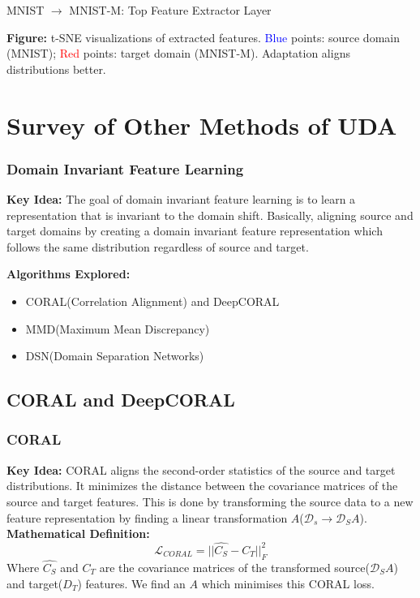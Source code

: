 \documentclass{beamer}
\begin{document}
\begin{frame}{\centering \large MNIST $\rightarrow$ MNIST-M: Top Feature Extractor Layer}
\vspace{0.3cm}

\small
\textbf{Figure:} t-SNE visualizations of extracted features. \textcolor{blue}{Blue} points: source domain (MNIST); \textcolor{red}{Red} points: target domain (MNIST-M). Adaptation aligns distributions better.
\end{frame}

\section{Survey of Other Methods of UDA}

\begin{frame}
    \frametitle{Domain Invariant Feature Learning}
    \textbf{Key Idea:} The goal of domain invariant feature learning is to learn a representation that is invariant to the domain shift. Basically, aligning source and target domains by creating a domain invariant feature representation which follows the same distribution regardless of source and target.
 
    \textbf{Algorithms Explored:}
    \begin{itemize}
    \item CORAL(Correlation Alignment) and DeepCORAL
    \item MMD(Maximum Mean Discrepancy)
    \item DSN(Domain Separation Networks)
    \end{itemize}
\end{frame}

\subsection{CORAL and DeepCORAL}
 
\begin{frame}
\frametitle{CORAL}
    \textbf{Key Idea:} CORAL aligns the second-order statistics of the source and target distributions. It minimizes the distance between the covariance matrices of the source and target features. This is done by transforming the source data to a new feature representation by finding a linear transformation $A$($\mathcal{D}_s \rightarrow \mathcal{D}_S A$).\\
 
    \textbf{Mathematical Definition:}
    \[
        \mathcal{L}_{CORAL} = ||\widehat{C_S} - C_T||_F^2
    \]
    Where \(\widehat{C_S}\) and \(C_T\) are the covariance matrices of the transformed source($\mathcal{D}_SA$) and target($D_T$) features. We find an $A$ which minimises this CORAL loss.
\end{frame}
 
\end{document}
